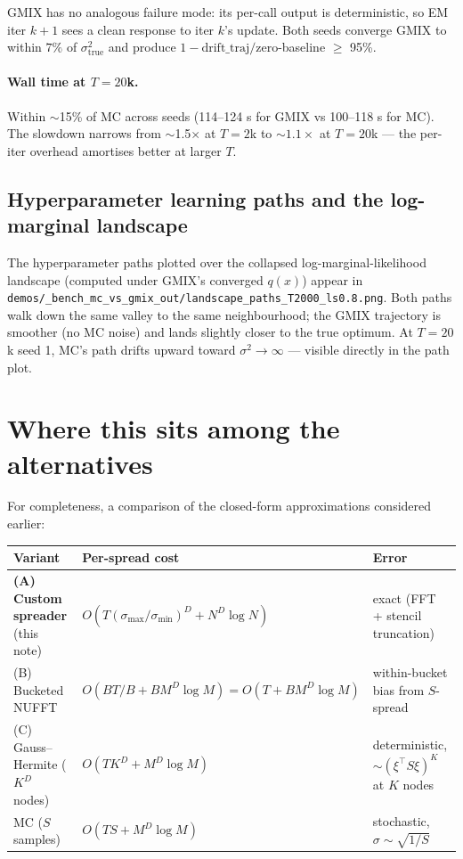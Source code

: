 \documentclass[11pt]{article}
\newcommand{\code}[1]{\texttt{\small #1}}
\begin{document}
GMIX has no analogous failure mode: its per-call output is
deterministic, so EM iter $k+1$ sees a clean response to iter $k$'s
update.  Both seeds converge GMIX to within $7\%$ of $\sigma^2_{\text{true}}$
and produce $1\!-\!\text{drift\_traj}/\text{zero}$-baseline $\geq$ 95\%.

\paragraph{Wall time at $T = 20$k.}  Within $\sim$15\% of MC across
seeds (114--124 s for GMIX vs 100--118 s for MC).  The slowdown
narrows from $\sim$1.5$\times$ at $T\!=\!2$k to ${\sim}1.1\times$ at
$T\!=\!20$k --- the per-iter overhead amortises better at larger $T$.

\subsection{Hyperparameter learning paths and the log-marginal landscape}

The hyperparameter paths plotted over the collapsed
log-marginal-likelihood landscape (computed under GMIX's converged
$q(x)$) appear in
\code{demos/\_bench\_mc\_vs\_gmix\_out/landscape\_paths\_T2000\_ls0.8.png}.
Both paths walk down the same valley to the same neighbourhood; the
GMIX trajectory is smoother (no MC noise) and lands slightly closer to
the true optimum.  At $T\!=\!20$k seed 1, MC's path drifts upward
toward $\sigma^2 \to \infty$ --- visible directly in the path plot.

\section{Where this sits among the alternatives}
\label{sec:alternatives}

For completeness, a comparison of the closed-form approximations
considered earlier:

\begin{center}
\renewcommand{\arraystretch}{1.4}
\begin{tabular}{lll}
\toprule
Variant & Per-spread cost & Error \\
\midrule
\textbf{(A) Custom spreader} (this note)
& $O(T(\sigma_{\max}/\sigma_{\min})^D + N^D \log N)$
& exact (FFT + stencil truncation) \\
(B) Bucketed NUFFT
& $O(BT/B + B M^D \log M) = O(T + B M^D \log M)$
& within-bucket bias from $S$-spread \\
(C) Gauss--Hermite ($K^D$ nodes)
& $O(TK^D + M^D \log M)$
& deterministic, $\sim (\xi^\top S\xi)^K$ at $K$ nodes \\
MC ($S$ samples)
& $O(TS + M^D \log M)$
& stochastic, $\sigma\sim\sqrt{1/S}$ \\
\bottomrule
\end{tabular}
\end{center}
\end{document}
